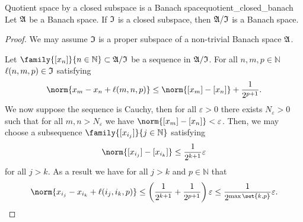 \begin{lemma}{Quotient space by a closed subspace is a Banach space}{quotient_closed_banach}
    Let \(\mathfrak{A}\) be a Banach space. If \(\mathfrak{I}\) is a closed subspace, then \(\mathfrak{A}/\mathfrak{I}\) is a Banach space.
\end{lemma}
\begin{proof}
    We may assume \(\mathfrak{I}\) is a proper subspace of a non-trivial Banach space \(\mathfrak{A}\).

    Let \(\family{[x_n]}{n \in \mathbb{N}} \subset \algebra{A}/\algebra{I}\) be a sequence in \(\mathfrak{A}/\mathfrak{I}\). For all \(n,m,p \in \mathbb{N}\)  \(\ell(n,m,p) \in \mathfrak{I}\) satisfying
    \begin{equation*}
        \norm{x_m - x_n + \ell(m,n,p)} \leq \norm{[x_m] - [x_n]} + \frac{1}{2^{p+1}}.
    \end{equation*}
    We now suppose the sequence is Cauchy, then for all \(\varepsilon> 0\) there exists \(N_{\varepsilon} > 0\) such that for all \(m, n > N_{\varepsilon}\) we have \(\norm{[x_m] - [x_n]} < \varepsilon\). Then, we may choose a subsequence \(\family{[x_{i_j}]}{j \in \mathbb{N}}\) satisfying
    \begin{equation*}
        \norm{[x_{i_j}] - [x_{i_k}]} \leq \frac{1}{2^{k+1}}\varepsilon
    \end{equation*}
    for all \(j > k\). As a result we have for all \(j > k\) and \(p \in \mathbb{N}\) that
    \begin{equation*}
        \norm{x_{i_j} - x_{i_k} + \ell(i_j, i_k, p)} \leq \left(\frac{1}{2^{k+1}} + \frac{1}{2^{p+1}}\right)\varepsilon \leq \frac{1}{2^{\max\set{k,p}}}\varepsilon.
    \end{equation*}


\end{proof}
